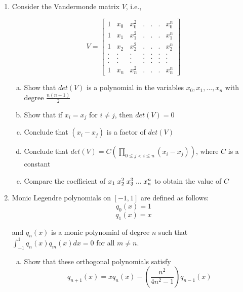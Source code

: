 \documentclass{article}
\begin{document}
\begin{enumerate}
\item Consider the Vandermonde matrix $V$, i.e.,

    $$ V = 
    \begin{bmatrix}
        1 & x_{0} & x_{0}^{2} & . & . & . & x_{0}^{n}\\
        1 & x_{1} & x_{1}^{2} & . & . & . & x_{1}^{n}\\
        1 & x_{2} & x_{2}^{2} & . & . & . & x_{2}^{n}\\
        . & .     & .         & . & . & . & . \\
        . & .     & .         & . & . & . & . \\
        . & .     & .         & . & . & . & . \\
        1 & x_{n} & x_{n}^{2} & . & . & . & x_{n}^{n} 
    \end{bmatrix}
    $$



\begin{enumerate}[(a)]  
\item Show that $det(V)$ is a polynomial in the variables $x_{0}, x_{1}, ..., x_{n}$ with degree $\displaystyle \frac{n(n+1)}{2}$
\item Show that if $x_{i} = x_{j}$ for $i \neq j$, then $det(V) = 0$
\item Conclude that $(x_{i} - x_{j})$ is a factor of $det(V)$
\item Conclude that $det(V) = C \left(\displaystyle \prod_{0 \leq j < i \leq n} (x_{i} - x_{j}) \right)$, where $C$ is a constant
\item Compare the coefficient of $x_{1} \hspace{1mm} x_{2}^{2} \hspace{1mm} x_{3}^{3} \hspace{1mm} ... \hspace{1mm} x_{n}^{n}$ to obtain the value of $C$
\end{enumerate}

\item Monic Legendre polynomials on $[-1, 1]$ are defined as follows:
    $$ q_{0}(x) = 1 $$
    $$ q_{1}(x) = x $$

and $q_{n}(x)$ is a monic polynomial of degree $n$ such that $\displaystyle \int_{-1}^{1} q_{n}(x) q_{m}(x) dx = 0 $ for all $m \neq n$.

\begin{enumerate}[(a)]
\item Show that these orthogonal polynomials satisfy
    $$q_{n+1}(x) = x q_{n}(x) - \left(\frac{n^{2}}{4n^{2} - 1} \right) q_{n-1}(x)$$


\end{enumerate}
\end{enumerate}
\end{document}
